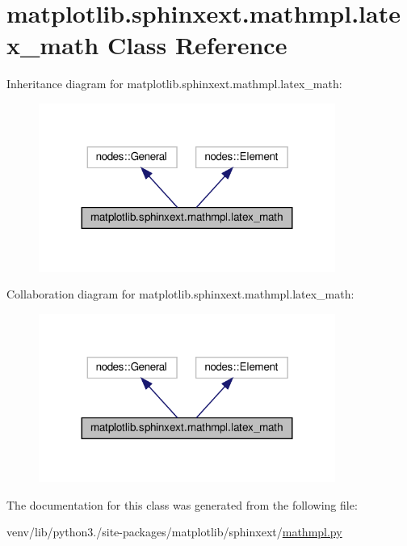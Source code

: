 \hypertarget{classmatplotlib_1_1sphinxext_1_1mathmpl_1_1latex__math}{}\section{matplotlib.\+sphinxext.\+mathmpl.\+latex\+\_\+math Class Reference}
\label{classmatplotlib_1_1sphinxext_1_1mathmpl_1_1latex__math}


Inheritance diagram for matplotlib.\+sphinxext.\+mathmpl.\+latex\+\_\+math\+:
\nopagebreak
\begin{figure}[H]
\begin{center}
\leavevmode
\includegraphics[width=275pt]{classmatplotlib_1_1sphinxext_1_1mathmpl_1_1latex__math__inherit__graph}
\end{center}
\end{figure}


Collaboration diagram for matplotlib.\+sphinxext.\+mathmpl.\+latex\+\_\+math\+:
\nopagebreak
\begin{figure}[H]
\begin{center}
\leavevmode
\includegraphics[width=275pt]{classmatplotlib_1_1sphinxext_1_1mathmpl_1_1latex__math__coll__graph}
\end{center}
\end{figure}


The documentation for this class was generated from the following file\+:\begin{DoxyCompactItemize}
\item 
venv/lib/python3./site-\/packages/matplotlib/sphinxext/\hyperlink{mathmpl_8py}{mathmpl.\+py}\end{DoxyCompactItemize}
